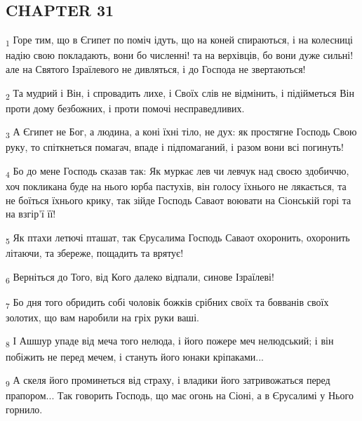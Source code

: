 \subsection{CHAPTER 31}
\begin{tcolorbox}
\textsubscript{1} Горе тим, що в Єгипет по поміч ідуть, що на коней спираються, і на колесниці надію свою покладають, вони бо численні! та на верхівців, бо вони дуже сильні! але на Святого Ізраїлевого не дивляться, і до Господа не звертаються!
\end{tcolorbox}
\begin{tcolorbox}
\textsubscript{2} Та мудрий і Він, і спровадить лихе, і Своїх слів не відмінить, і підійметься Він проти дому безбожних, і проти помочі несправедливих.
\end{tcolorbox}
\begin{tcolorbox}
\textsubscript{3} А Єгипет не Бог, а людина, а коні їхні тіло, не дух: як простягне Господь Свою руку, то спіткнеться помагач, впаде і підпомаганий, і разом вони всі погинуть!
\end{tcolorbox}
\begin{tcolorbox}
\textsubscript{4} Бо до мене Господь сказав так: Як муркає лев чи левчук над своєю здобиччю, хоч покликана буде на нього юрба пастухів, він голосу їхнього не лякається, та не боїться їхнього крику, так зійде Господь Саваот воювати на Сіонській горі та на взгір'ї її!
\end{tcolorbox}
\begin{tcolorbox}
\textsubscript{5} Як птахи летючі пташат, так Єрусалима Господь Саваот охоронить, охоронить літаючи, та збереже, пощадить та врятує!
\end{tcolorbox}
\begin{tcolorbox}
\textsubscript{6} Верніться до Того, від Кого далеко відпали, синове Ізраїлеві!
\end{tcolorbox}
\begin{tcolorbox}
\textsubscript{7} Бо дня того обридить собі чоловік божків срібних своїх та бовванів своїх золотих, що вам наробили на гріх руки ваші.
\end{tcolorbox}
\begin{tcolorbox}
\textsubscript{8} І Ашшур упаде від меча того нелюда, і його пожере меч нелюдський; і він побіжить не перед мечем, і стануть його юнаки кріпаками...
\end{tcolorbox}
\begin{tcolorbox}
\textsubscript{9} А скеля його проминеться від страху, і владики його затривожаться перед прапором... Так говорить Господь, що має огонь на Сіоні, а в Єрусалимі у Нього горнило.
\end{tcolorbox}
